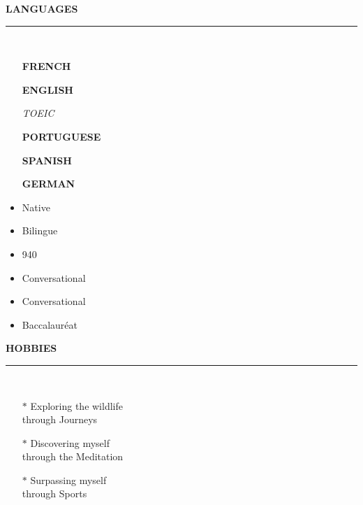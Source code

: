 \documentclass[9pt,a4paper]{article}
\newcommand{\myline}[1]{\rule{#1}{1.0pt}\\}
\newcommand{\topic}[1]{\textbf{\Large\selectfont\MakeUppercase{#1}}\\\vspace{-1em}\myline{1.0cm}}
\begin{document}
\begin{minipage}[c]{0.3\linewidth}
\begin{flushleft}
\vspace{1em}
\topic{Languages}
\vspace{1em}
\begin{minipage}[c]{0.45\linewidth}
\begin{flushleft}
    \begin{itemize}[leftmargin=0cm]
        \setlength\itemsep{-0.5em}
        \item[] \textbf{FRENCH}
        \item[] \textbf{ENGLISH}
        \item[] \hspace{1em}\textit{TOEIC}
        \item[] \textbf{PORTUGUESE}
        \item[] \textbf{SPANISH}
        \item[] \textbf{GERMAN}
    \end{itemize}
\end{flushleft}
\end{minipage}
\begin{minipage}[c]{0.45\linewidth}
    \begin{itemize}[label={},leftmargin=*]
        \setlength\itemsep{-0.5em}
        \item Native 
        \item Bilingue
        \item 940
        \item Conversational
        \item Conversational
        \item Baccalauréat
    \end{itemize}
\end{minipage}
\vspace{0.1em} 

\vspace{1.5em}
\topic{Hobbies}
\vspace{-1em} 
\begin{itemize}[leftmargin=*]
    \setlength\itemsep{-0.5em}
    \item[$\ast$] \textrm{Exploring the wildlife \\through Journeys}
    \item[$\ast$] \textrm{Discovering myself \\through the Meditation}
    \item[$\ast$] \textrm{Surpassing myself \\through Sports}
\end{itemize}
\vspace{-1em} 


\end{flushleft}
\end{minipage}
\end{document}
